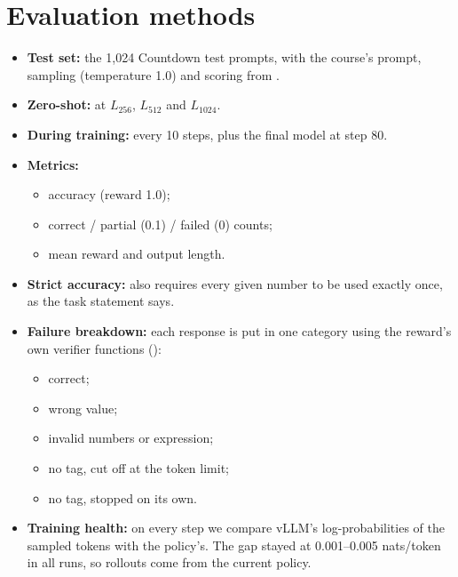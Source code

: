 \documentclass[10.5pt]{article}
\begin{document}
\section{Evaluation methods}
\begin{itemize}
\item \textbf{Test set:} the 1,024 Countdown test prompts, with the course's prompt, sampling (temperature 1.0) and scoring
  from .
\item \textbf{Zero-shot:} at $L_{256}$, $L_{512}$ and $L_{1024}$.
\item \textbf{During training:} every 10 steps, plus the final model at step 80.
\item \textbf{Metrics:}
  \begin{itemize}
  \item accuracy (reward 1.0);
  \item correct / partial (0.1) / failed (0) counts;
  \item mean reward and output length.
  \end{itemize}
\item \textbf{Strict accuracy:} also requires every given number to be used exactly once, as the task statement says.
\item \textbf{Failure breakdown:} each response is put in one category using the reward's own verifier functions
  ():
  \begin{itemize}
  \item correct;
  \item wrong value;
  \item invalid numbers or expression;
  \item no tag, cut off at the token limit;
  \item no tag, stopped on its own.
  \end{itemize}
\item \textbf{Training health:} on every step we compare vLLM's log-probabilities of the sampled tokens with the policy's.
  The gap stayed at 0.001--0.005 nats/token in all runs, so rollouts come from the current policy.
\end{itemize}
\end{document}
